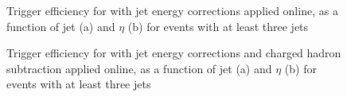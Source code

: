 \begin{figure}[hbtp]
    \centering
{}
\hfill
{}
\caption[Trigger efficiency for \HLTThreeCentralPFJet as a function of jet \pt and $\eta$]{Trigger efficiency for
\HLTThreeCentralPFJet with jet energy corrections applied online, as a function of jet \pt (a) and $\eta$ (b) for events
with at least three jets}
\label{fig:top_hlt_pt_eta_JEC_3jets} 
 \end{figure}

\begin{figure}[hbtp]
    \centering
{}
\hfill
{}
\caption[Trigger efficiency for \HLTThreeCentralPFJet as a function of jet \pt and $\eta$]{Trigger efficiency for
\HLTThreeCentralPFJet with jet energy corrections and charged hadron subtraction applied online, as a function of jet
\pt (a) and $\eta$ (b) for events with at least three jets}
\label{fig:top_hlt_pt_eta_JEC_PFnoPU_3jets} 
 \end{figure}


